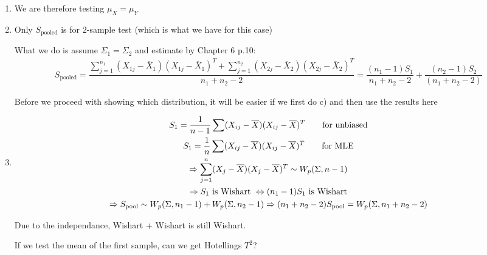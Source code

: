 \begin{enumerate}[label=\arabic*., leftmargin=*]
  \begin{enumerate}[label=\alph*),leftmargin=*]
    \item We are therefore testing $\mu_X=\mu_Y$ 
      \par\bigskip
    \item Only $S_{\text{pooled}}$ is for $2$-sample test (which is what we have for this case)\par
      \noindent What we do is assume $\Sigma_1 = \Sigma_2$ and estimate by Chapter 6 p.10:
      \begin{equation*}
        \begin{gathered}
          S_{\text{pooled}} = \dfrac{\sum_{j=1}^{n_1}(X_{1j}-\overline{X}_1)(X_{1j}-\overline{X}_1)^T+\sum_{j=1}^{n_2}(X_{2j}-\overline{X}_2)(X_{2j}-\overline{X}_2)^T}{n_1+n_2-2} = \dfrac{(n_1-1)S_1}{n_1+n_2-2}+ \dfrac{(n_2-1)S_2}{(n_1+n_2-2)}
        \end{gathered}
      \end{equation*}
      \par\bigskip
      \noindent Before we proceed with showing which distribution, it will be easier if we first do c) and then use the results here
      \par\bigskip
    \item 
      \begin{equation*}
        \begin{gathered}
          S_1 = \dfrac{1}{n-1}\sum(X_{ij}-\overline{X})(X_{ij}-\overline{X})^T\qquad\text{for unbiased}\\
          S_1 = \dfrac{1}{n}\sum(X_{ij}-\overline{X})(X_{ij}-\overline{X})^T\qquad\text{for MLE}\\
          \Rightarrow \sum_{j=1}^{n}(X_j-\overline{X})(X_j-\overline{X})^T\sim W_p(\Sigma,n-1)\\
          \Rightarrow S_1\text{ is Wishart }\Leftrightarrow (n_1-1)S_1\text{ is Wishart}\\
          \Rightarrow S_{\text{pool}}\sim W_p(\Sigma,n_1-1)+W_p(\Sigma,n_2-1)\Rightarrow (n_1+n_2-2)S_{\text{pool}} = W_p(\Sigma,n_1+n_2-2)
        \end{gathered}
      \end{equation*}
      \par\bigskip
      \noindent Due to the independance, Wishart + Wishart is still Wishart.\par
      \noindent If we test the mean of the first sample, can we get Hotellings $T^2$?
      \begin{equation*}
        \begin{gathered}

\end{gathered}
\end{equation*}
\end{enumerate}
\end{enumerate}
